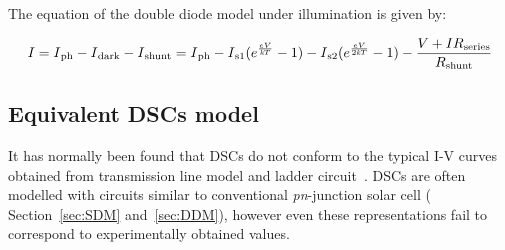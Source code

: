The equation of the double diode model under illumination is given by:  

  \begin{equation}
   \begin{aligned}
    I = I\textsubscript{ph} - I\textsubscript{dark} - I\textsubscript{shunt} = I\textsubscript{ph} -  I\textsubscript{s1} (e^{\frac{eV}{\textit{k}T}}-1) - I\textsubscript{s2} (e^{\frac{eV}{2\textit{k}T}}-1)- \dfrac{V+IR\textsubscript{series}}{R\textsubscript{shunt}}
     \label{eq:equ_current_double}
    \end{aligned}
    \end{equation}
  
\subsection{Equivalent DSCs model}\label{sec:eDDM}

It has normally been found that \ac{DSCs} do not conform to the typical I-V curves obtained from transmission line model and ladder circuit~\cite{yong2008modeling}. \ac{DSCs} are often modelled with circuits similar to conventional \textit{pn}-junction solar cell ( Section~\ref{sec:SDM} and~\ref{sec:DDM}), however even these representations fail to correspond to experimentally obtained values.

